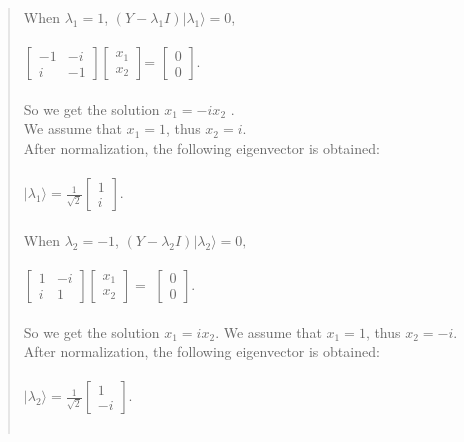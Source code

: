 \documentclass[UTF8]{ctexart}
\begin{document}
\begin{quote}
	When $\lambda_{1}=1$,
    	$(Y-\lambda_{1} I)|\lambda_{1}\rangle=0$, \\  \\
	$\begin{bmatrix}-1&-i\\i&-1\end{bmatrix}\begin{bmatrix}x_{1}\\x_{2}\end{bmatrix}$=
	$\begin{bmatrix}0\\0\end{bmatrix}$. \\  \\ 
	So we get the solution $x_{1}=-ix_{2}$ .\\
	We  assume that $x_{1}=1$, thus $x_{2}=i$.  \\ 
	After normalization, the following eigenvector is obtained:\\  \\
	$|\lambda_{1}\rangle=\frac{1}{\sqrt{2}}\begin{bmatrix}1\\i\end{bmatrix}.$ 
	\\  \\
	When $\lambda_{2}=-1$,
    	$(Y-\lambda_{2} I)|\lambda_{2}\rangle=0,$ \\  \\
	$\begin{bmatrix}1&-i\\i&1\end{bmatrix}\begin{bmatrix}x_{1}\\x_{2}\end{bmatrix}=$
	$\begin{bmatrix}0\\0\end{bmatrix}$. \\  \\
	So we get the solution $x_{1}=ix_{2}$.
	We  assume that $x_{1}=1$, thus $x_{2}=-i$.\\
	After normalization, the following eigenvector is obtained:\\  \\
	$|\lambda_{2}\rangle=\frac{1}{\sqrt{2}}\begin{bmatrix}1\\-i\end{bmatrix}.$ \\  \\

\end{quote}
\end{document}
